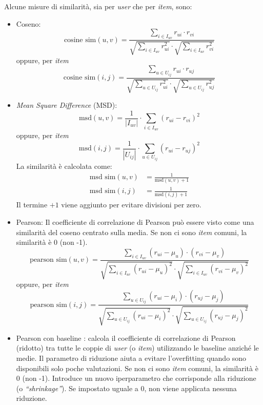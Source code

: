 Alcune misure di similarità, sia per \textit{user} che per \textit{item}, sono:
\begin{itemize}
    \item Coseno:
        \[
        \text{cosine sim}(u, v) = \frac{\sum\limits_{i \in I_{uv}} r_{ui} \cdot r_{vi}}{\sqrt{\sum\limits_{i \in I_{uv}} r_{ui}^2} \cdot \sqrt{\sum\limits_{i \in I_{uv}} r_{vi}^2}}
        \]
        oppure, per \textit{item}
        \[
        \text{cosine sim}(i, j) = \frac{\sum\limits_{u \in U_{ij}} r_{ui} \cdot r_{uj}}{\sqrt{\sum\limits_{u \in U_{ij}} r_{ui}^2} \cdot \sqrt{\sum\limits_{u \in U_{ij}} r_{uj}^2}}
        \]
    \item \textit{Mean Square Difference} (MSD):
        \[
        \text{msd}(u, v) = \frac{1}{|I_{uv}|} \cdot \sum\limits_{i \in I_{uv}} (r_{ui} - r_{vi})^2
        \]
        oppure, per \textit{item}
        \[
        \text{msd}(i, j) = \frac{1}{|U_{ij}|} \cdot \sum\limits_{u \in U_{ij}} (r_{ui} - r_{uj})^2
        \]
        La similarità è calcolata come:
        \begin{align*}
            \text{msd sim}(u, v) &= \frac{1}{\text{msd}(u, v) + 1} \\
            \text{msd sim}(i, j) &= \frac{1}{\text{msd}(i, j) + 1}
        \end{align*}
        Il termine $+1$ viene aggiunto per evitare divisioni per zero.
    \item Pearson: Il coefficiente di correlazione di Pearson può essere visto come una similarità del coseno centrato sulla media. Se non ci sono \textit{item} comuni, la similarità è 0 (non -1).
        \[
        \text{pearson sim}(u, v) = \frac{\sum\limits_{i \in I_{uv}} (r_{ui} - \mu_u) \cdot (r_{vi} - \mu_v)}{\sqrt{\sum\limits_{i \in I_{uv}} (r_{ui} - \mu_u)^2} \cdot \sqrt{\sum\limits_{i \in I_{uv}} (r_{vi} - \mu_v)^2}}
        \]
        oppure, per \textit{item}
        \[
        \text{pearson sim}(i, j) = \frac{\sum\limits_{u \in U_{ij}} (r_{ui} - \mu_i) \cdot (r_{uj} - \mu_j)}{\sqrt{\sum\limits_{u \in U_{ij}} (r_{ui} - \mu_i)^2} \cdot \sqrt{\sum\limits_{u \in U_{ij}} (r_{uj} - \mu_j)^2}}
        \]
    \item Pearson con baseline \cite{Recommendation_book}: calcola il coefficiente di correlazione di Pearson (ridotto) tra tutte le coppie di \textit{user} (o \textit{item}) utilizzando le baseline anziché le medie. Il parametro di riduzione aiuta a evitare l'overfitting quando sono disponibili solo poche valutazioni. Se non ci sono \textit{item} comuni, la similarità è 0 (non -1). Introduce un nuovo iperparametro che corrisponde alla riduzione (o \textit{``shrinkage''}). Se impostato uguale a 0, non viene applicata nessuna riduzione.

\end{itemize}
